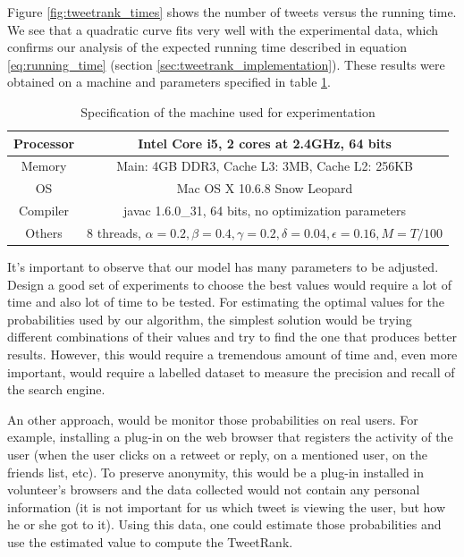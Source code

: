 Figure \ref{fig:tweetrank_times} shows the number of tweets versus the running time. We see that a quadratic curve fits very well with the experimental data, which confirms our analysis of the expected running time described in equation \ref{eq:running_time} (section \ref{sec:tweetrank_implementation}). These results were obtained on a machine and parameters specified in table \ref{table:machine_spec}. 

\begin{table}
\centering
\begin{tabular}{|c|c|}
\hline Processor & Intel Core i5, 2 cores at 2.4GHz, 64 bits \\
\hline Memory & Main: 4GB DDR3, Cache L3: 3MB, Cache L2: 256KB \\
\hline OS &  Mac OS X 10.6.8 Snow Leopard \\
\hline Compiler & javac 1.6.0\_31, 64 bits, no optimization parameters \\
\hline Others & 8 threads, $\alpha = 0.2, \beta = 0.4, \gamma = 0.2, \delta = 0.04, \epsilon = 0.16, M = T/100$ \\
\hline
\end{tabular}
\caption{Specification of the machine used for experimentation}
\label{table:machine_spec}
\end{table}

It's important to observe that our model has many parameters to be adjusted. Design a good set of experiments to choose the best values would require a lot of time and also lot of time to be tested. For estimating the optimal values for the probabilities used by our algorithm, the simplest solution would be trying different combinations of their values and try to find the one that produces better results. However, this would require a tremendous amount of time and, even more important, would require a labelled dataset to measure the precision and recall of the search engine.

An other approach, would be monitor those probabilities on real users. For example, installing a plug-in on the web browser that registers the activity of the user (when the user clicks on a retweet or reply, on a mentioned user, on the friends list, etc). To preserve anonymity, this would be a plug-in installed in volunteer's browsers and the data collected would not contain any personal information (it is not important for us which tweet is viewing the user, but how he or she got to it). Using this data, one could estimate those probabilities and use the estimated value to compute the TweetRank.
